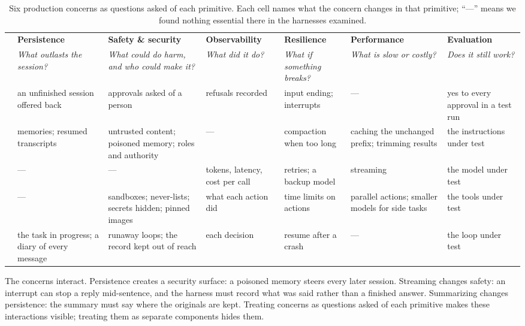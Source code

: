 \begin{table}[t]
\centering
\scriptsize
\setlength{\tabcolsep}{3pt}
\caption{Six production concerns as questions asked of each primitive. Each cell names what the concern changes in that primitive; ``---'' means we found nothing essential there in the harnesses examined.}
\label{tab:concerns}
\begin{tabularx}{\linewidth}{@{}l*{6}{Y}@{}}
\toprule
& \textbf{Persistence} & \textbf{Safety \& security} & \textbf{Observability} & \textbf{Resilience} & \textbf{Performance} & \textbf{Evaluation} \\
& \emph{What outlasts the session?} & \emph{What could do harm, and who could make it?} & \emph{What did it do?} & \emph{What if something breaks?} & \emph{What is slow or costly?} & \emph{Does it still work?} \\
\midrule
{} & an unfinished session offered back & approvals asked of a person & refusals recorded & input ending; interrupts & --- & yes to every approval in a test run \\
 & memories; resumed transcripts & untrusted content; poisoned memory; roles and authority & --- & compaction when too long & caching the unchanged prefix; trimming results & the instructions under test \\
 & --- & --- & tokens, latency, cost per call & retries; a backup model & streaming & the model under test \\
 & --- & sandboxes; never-lists; secrets hidden; pinned images & what each action did & time limits on actions & parallel actions; smaller models for side tasks & the tools under test \\
 & the task in progress; a diary of every message & runaway loops; the record kept out of reach & each decision & resume after a crash & --- & the loop under test \\
\bottomrule
\end{tabularx}
\end{table}

The concerns interact. Persistence creates a security surface: a poisoned memory steers every later session. Streaming changes safety: an interrupt can stop a reply mid-sentence, and the harness must record what was said rather than a finished answer. Summarizing changes persistence: the summary must say where the originals are kept. Treating concerns as questions asked of each primitive makes these interactions visible; treating them as separate components hides them.

